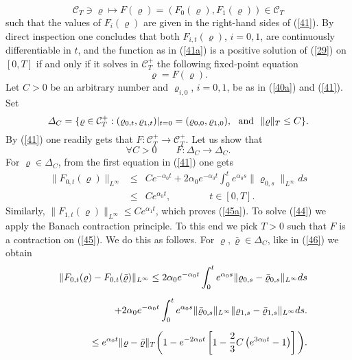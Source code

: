 \documentclass[reqno,11pt]{amsart}
\theoremstyle{definition}
\theoremstyle{remark}
\numberwithin{equation}{section}
\begin{document}
\begin{equation*}
  
\mathcal{C}_T \ni \varrho \mapsto F(\varrho) = (F_0(\varrho),
F_{1}(\varrho)) \in \mathcal{C}_T
\end{equation*}
such that the values of $F_i(\varrho)$ are given in the right-hand
sides of (\ref{41}). By direct inspection one concludes that both
$F_{i,t}(\varrho)$, $i=0,1$, are continuously differentiable in $t$,
and the function as in (\ref{41a}) is a positive solution of
(\ref{29}) on $[0,T]$ if and only if it solves in $\mathcal{C}_T^+$
the following fixed-point equation
\begin{equation}
  \label{44}
\varrho = F(\varrho).
\end{equation}
Let $C>0$ be an arbitrary number and $\varrho_{i,0}$, $i=0,1$, be as
in (\ref{40a}) and (\ref{41}). Set
\begin{equation}
  \label{45}
\varDelta_C = \{ \varrho\in \mathcal{C}_T^+ : (\varrho_{0,t},
\varrho_{1,t})|_{t=0}=(\varrho_{0,0}, \varrho_{1,0}), \ \ {\rm and }
\ \  \|\varrho\|_T \leq C\}.
\end{equation}
By (\ref{41}) one readily gets that $F:\mathcal{C}_T^+\to
\mathcal{C}_T^+$. Let us show that
\begin{equation}
  \label{45a}
\forall C>0 \qquad F:\varDelta_C\to \varDelta_C.
\end{equation}
For $\varrho \in \varDelta_C$, from the first equation in (\ref{41})
one gets
\begin{eqnarray}
  \label{46}
\| F_{0,t} (\varrho) \|_{L^\infty} & \leq &  C e^{-\alpha_0 t} + 2
\alpha_0 e^{-\alpha_0 t} \int_0^t e^{\alpha_0 s} \|\varrho_{0,s}
\|_{L^\infty} d s \\[.2cm] & \leq &  C e^{\alpha_0 t}, \qquad \qquad t \in
[0,T]. \nonumber
\end{eqnarray}
Similarly,  $\| F_{1,t} (\varrho) \|_{L^\infty} \leq C e^{\alpha_1
t}$, which proves (\ref{45a}). To solve (\ref{44}) we apply the
Banach contraction principle. To this end we pick $T>0$ such that
$F$ is a contraction on (\ref{45}). We do this as follows. For
$\varrho, \bar{\varrho} \in \varDelta_C$, like in (\ref{46}) we
obtain
\begin{eqnarray*}
  
& & \| F_{0,t} (\varrho)  - F_{0,t} (\bar{\varrho}) \|_{L^\infty}
\leq  2 \alpha_0 e^{-\alpha_0 t} \int_0^t e^{\alpha_0 s}
\|\varrho_{0,s} -
\bar{\varrho}_{0,s}\|_{L^\infty} d s \\[.2cm] & & \quad \qquad +
2 \alpha_0 e^{-\alpha_0 t} \int_0^t e^{\alpha_0 s}
\|\bar{\varrho}_{0,s}\|_{L^\infty} \|\varrho_{1,s} -
\bar{\varrho}_{1,s}\|_{L^\infty} d s. \nonumber \\[.2cm] & & \quad \qquad
\leq e^{\alpha_0 t} \|\varrho - \bar{\varrho}\|_T \bigg{(} 1 - e
^{-2 \alpha_0 t}\left[ 1 - \frac{2}{3} C \left( e^{3 \alpha_0 t} -1
\right) \right]\bigg{)} .\nonumber
\end{eqnarray*}
\end{document}
